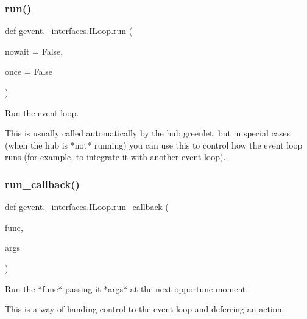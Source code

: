 \subsubsection{\texorpdfstring{run()}{run()}}
{\footnotesize\ttfamily def gevent.\+\_\+interfaces.\+I\+Loop.\+run (\begin{DoxyParamCaption}\item[{}]{nowait = {\ttfamily False},  }\item[{}]{once = {\ttfamily False} }\end{DoxyParamCaption})}

\begin{DoxyVerb}Run the event loop.

This is usually called automatically by the hub greenlet, but
in special cases (when the hub is *not* running) you can use
this to control how the event loop runs (for example, to integrate
it with another event loop).
\end{DoxyVerb}
 \mbox{\label{classgevent_1_1__interfaces_1_1_i_loop_a56e64ac55f2f91b38cd415b57d4e37c5}} 
\subsubsection{\texorpdfstring{run\+\_\+callback()}{run\_callback()}}
{\footnotesize\ttfamily def gevent.\+\_\+interfaces.\+I\+Loop.\+run\+\_\+callback (\begin{DoxyParamCaption}\item[{}]{func,  }\item[{}]{args }\end{DoxyParamCaption})}

\begin{DoxyVerb}Run the *func* passing it *args* at the next opportune moment.

This is a way of handing control to the event loop and deferring
an action.
\end{DoxyVerb}
 \mbox{\label{classgevent_1_1__interfaces_1_1_i_loop_a015a1465fa9731920cbadab0cf735695}} 
